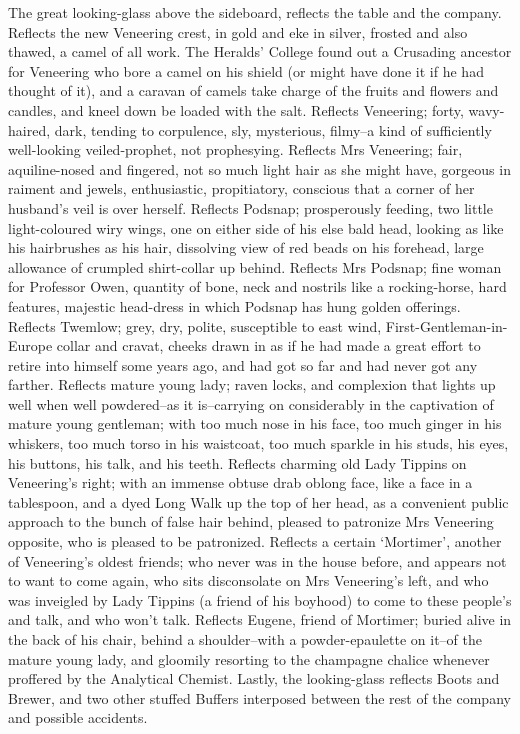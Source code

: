 The great looking-glass above the sideboard, reflects the table and the
company. Reflects the new Veneering crest, in gold and eke in silver,
frosted and also thawed, a camel of all work. The Heralds’ College found
out a Crusading ancestor for Veneering who bore a camel on his shield
(or might have done it if he had thought of it), and a caravan of camels
take charge of the fruits and flowers and candles, and kneel down be
loaded with the salt. Reflects Veneering; forty, wavy-haired, dark,
tending to corpulence, sly, mysterious, filmy--a kind of sufficiently
well-looking veiled-prophet, not prophesying. Reflects Mrs Veneering;
fair, aquiline-nosed and fingered, not so much light hair as she might
have, gorgeous in raiment and jewels, enthusiastic, propitiatory,
conscious that a corner of her husband’s veil is over herself. Reflects
Podsnap; prosperously feeding, two little light-coloured wiry wings, one
on either side of his else bald head, looking as like his hairbrushes as
his hair, dissolving view of red beads on his forehead, large allowance
of crumpled shirt-collar up behind. Reflects Mrs Podsnap; fine woman
for Professor Owen, quantity of bone, neck and nostrils like a
rocking-horse, hard features, majestic head-dress in which Podsnap has
hung golden offerings. Reflects Twemlow; grey, dry, polite, susceptible
to east wind, First-Gentleman-in-Europe collar and cravat, cheeks drawn
in as if he had made a great effort to retire into himself some years
ago, and had got so far and had never got any farther. Reflects mature
young lady; raven locks, and complexion that lights up well when well
powdered--as it is--carrying on considerably in the captivation of
mature young gentleman; with too much nose in his face, too much ginger
in his whiskers, too much torso in his waistcoat, too much sparkle in
his studs, his eyes, his buttons, his talk, and his teeth. Reflects
charming old Lady Tippins on Veneering’s right; with an immense obtuse
drab oblong face, like a face in a tablespoon, and a dyed Long Walk up
the top of her head, as a convenient public approach to the bunch of
false hair behind, pleased to patronize Mrs Veneering opposite, who
is pleased to be patronized. Reflects a certain ‘Mortimer’, another
of Veneering’s oldest friends; who never was in the house before,
and appears not to want to come again, who sits disconsolate on Mrs
Veneering’s left, and who was inveigled by Lady Tippins (a friend of
his boyhood) to come to these people’s and talk, and who won’t talk.
Reflects Eugene, friend of Mortimer; buried alive in the back of his
chair, behind a shoulder--with a powder-epaulette on it--of the mature
young lady, and gloomily resorting to the champagne chalice whenever
proffered by the Analytical Chemist. Lastly, the looking-glass reflects
Boots and Brewer, and two other stuffed Buffers interposed between the
rest of the company and possible accidents.

